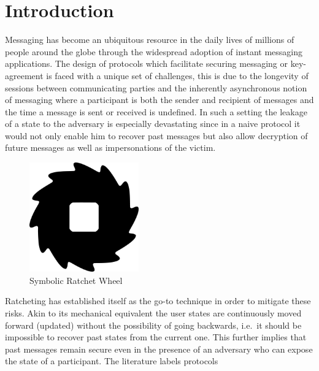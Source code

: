 \documentclass[11pt,a4paper,twoside,openright,bibliography=totoc]{scrbook}
\begin{document}

\tableofcontents

\chapter{Introduction}
\label{chap:introduction}

Messaging has become an ubiquitous resource in the daily lives of
millions of people around the globe through the widespread adoption of
instant messaging applications. The design of protocols which
facilitate securing messaging or key-agreement is faced with a unique
set of challenges, this is due to the longevity of sessions between
communicating parties and the inherently asynchronous notion of
messaging where a participant is both the sender and recipient of
messages and the time a message is sent or received is undefined. In
such a setting the leakage of a state to the adversary is especially
devastating since in a naive protocol it would not only enable him to
recover past messages but also allow decryption of future messages as
well as impersonations of the victim.
\begin{figure}
  \centering
  \includegraphics[width=0.42\textwidth]{figures/ratchet-icon.eps}
  \caption[Symbolic Ratchet Wheel]{Symbolic Ratchet Wheel\footnotemark}
  \label{fig:ratchet-wheel}
\end{figure}
 Ratcheting has
established itself as the go-to technique in
order to mitigate these risks. Akin to its mechanical equivalent the
user states are continuously moved forward (updated) without the
possibility of going backwards, i.e.~it should be impossible to
recover past states from the current one.
This further implies that
past messages remain secure even in the presence of an adversary who
can expose the state of a participant. The literature labels protocols
\end{document}
